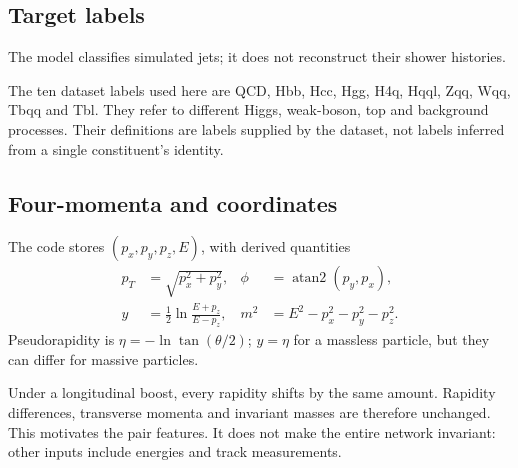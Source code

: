 \documentclass[11pt,a4paper]{article}
\numberwithin{equation}{section}
\begin{document}
\subsection{Target labels}
The model classifies simulated jets; it does not reconstruct their shower histories.

The ten dataset labels used here are QCD, Hbb, Hcc, Hgg, H4q, Hqql,
Zqq, Wqq, Tbqq and Tbl.
They refer to different Higgs, weak-boson, top and background processes.
Their definitions are labels supplied by the dataset, not labels inferred
from a single constituent's identity.

\subsection{Four-momenta and coordinates}
The code stores $(p_x,p_y,p_z,E)$, with derived quantities
\begin{align}
 p_T&=\sqrt{p_x^2+p_y^2},&
 \phi&=\operatorname{atan2}(p_y,p_x),\\
 y&=\frac12\ln\frac{E+p_z}{E-p_z},&
 m^2&=E^2-p_x^2-p_y^2-p_z^2.
\end{align}
Pseudorapidity is $\eta=-\ln\tan(\theta/2)$; $y=\eta$ for a massless
particle, but they can differ for massive particles.

Under a longitudinal boost, every rapidity shifts by the same amount.
Rapidity differences, transverse momenta and invariant masses are therefore
unchanged. This motivates the pair features. It does not make the entire
network invariant: other inputs include energies and track measurements.
\end{document}
